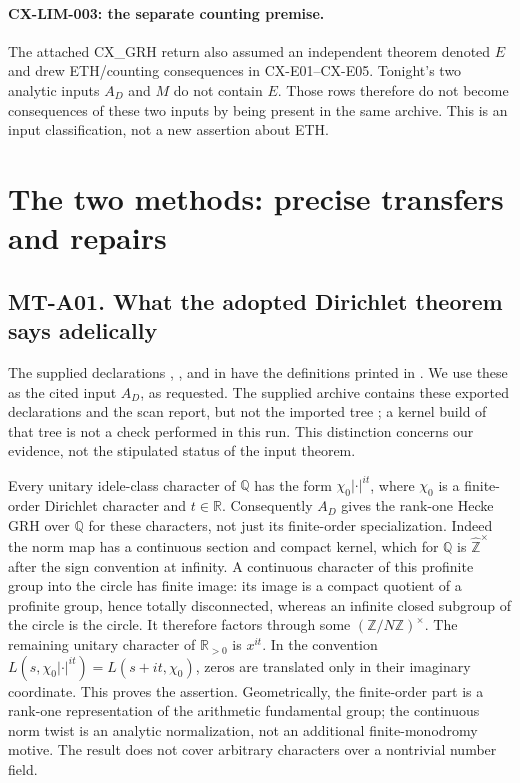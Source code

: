 \documentclass[11pt,a4paper]{article}
\begin{document}
\paragraph{CX-LIM-003: the separate counting premise.}
The attached CX\_GRH return also assumed an independent theorem denoted
$E$ and drew ETH/counting consequences in CX-E01--CX-E05. Tonight's two
analytic inputs $A_D$ and $M$ do not contain $E$. Those rows therefore do
not become consequences of these two inputs by being present in the same
archive. This is an input classification, not a new assertion about ETH.


\section{The two methods: precise transfers and repairs}
\label{sec:methods}

\subsection*{MT-A01. What the adopted Dirichlet theorem says adelically}
The supplied declarations ,
, and
 in  have the
definitions printed in .  We use these as the
cited input $A_D$, as requested.  The supplied archive contains these exported
declarations and the scan report, but not the imported tree
; a kernel build of that tree is
not a check performed in this run.  This distinction concerns our evidence,
not the stipulated status of the input theorem.

Every unitary idele-class character of $\mathbb Q$ has the form
$\chi_0|\cdot|^{it}$, where $\chi_0$ is a finite-order Dirichlet character
and $t\in\mathbb R$.  Consequently $A_D$ gives the rank-one Hecke GRH over
$\mathbb Q$ for these characters, not just its finite-order specialization.
Indeed the norm map has a continuous section and compact kernel, which for
$\mathbb Q$ is $\widehat{\mathbb Z}^{\times}$ after the sign convention at
infinity.  A continuous character of this profinite group into the circle has
finite image: its image is a compact quotient of a profinite group, hence
totally disconnected, whereas an infinite closed subgroup of the circle is
the circle.  It therefore factors through some
$(\mathbb Z/N\mathbb Z)^\times$.  The remaining unitary character of
$\mathbb R_{>0}$ is $x^{it}$.  In the convention
$L(s,\chi_0|\cdot|^{it})=L(s+it,\chi_0)$, zeros are translated only in
their imaginary coordinate.  This proves the assertion.  Geometrically,
the finite-order part is a rank-one representation of the arithmetic
fundamental group; the continuous norm twist is an analytic normalization,
not an additional finite-monodromy motive.  The result does not cover
arbitrary characters over a nontrivial number field.
\end{document}
